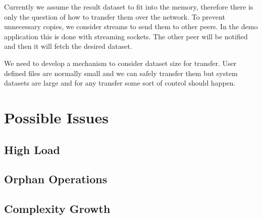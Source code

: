 Currently we assume the result dataset to fit into the memory, 
therefore there is only the question of how to transfer them over the network. 
To prevent unnecessary copies, we consider streams to send them to other peers. 
In the demo application this is done with streaming sockets. 
The other peer will be notified and then it will fetch the desired dataset.

We need to develop a mechanism to consider dataset size for transfer. 
User defined files are normally small and we can safely transfer them but
system datasets are large and for any transfer some sort of control should happen.

\section{Possible Issues}
\subsection{High Load}
\subsection{Orphan Operations}
\subsection{Complexity Growth}